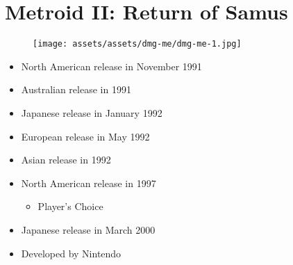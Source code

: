 \documentclass{book}
\begin{document}
\begingroup \chapter*{Metroid II: Return of Samus} \endgroup
\begin{figure}[H]
\vskip 4pt
\centering
\texttt{[image: assets/assets/dmg-me/dmg-me-1.jpg]}\end{figure}
\begin{itemize} [nosep]




\item North American release in November 1991







\item Australian release in 1991







\item Japanese release in January 1992







\item European release in May 1992







\item Asian release in 1992







\item North American release in 1997
\begin{itemize} [nosep]\item Player’s Choice\end{itemize}\noindent






\item Japanese release in March 2000





































\item Developed by Nintendo

\end{itemize}\noindent
\end{document}
